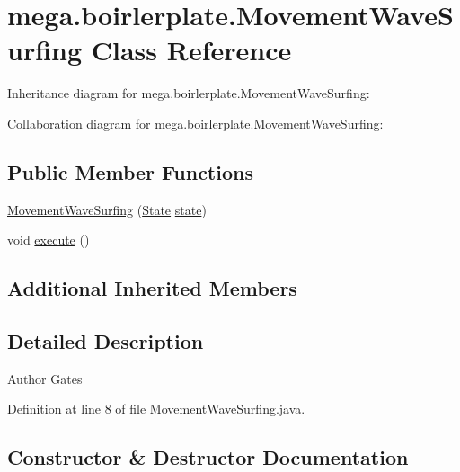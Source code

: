 \hypertarget{classmega_1_1boirlerplate_1_1_movement_wave_surfing}{}\section{mega.\+boirlerplate.\+Movement\+Wave\+Surfing Class Reference}
\label{classmega_1_1boirlerplate_1_1_movement_wave_surfing}


Inheritance diagram for mega.\+boirlerplate.\+Movement\+Wave\+Surfing\+:


Collaboration diagram for mega.\+boirlerplate.\+Movement\+Wave\+Surfing\+:
\subsection*{Public Member Functions}
\begin{DoxyCompactItemize}
\item 
\hyperlink{classmega_1_1boirlerplate_1_1_movement_wave_surfing_a1dffeffc125195fb4e59acaecaec00a3}{Movement\+Wave\+Surfing} (\hyperlink{classmega_1_1boirlerplate_1_1_state}{State} \hyperlink{classmega_1_1boirlerplate_1_1_component_a87b0d70f323b5fee60a200e07c9c20fd}{state})
\item 
void \hyperlink{classmega_1_1boirlerplate_1_1_movement_wave_surfing_a3bc154028a2cbcfd699d8fd59bdbcc14}{execute} ()
\end{DoxyCompactItemize}
\subsection*{Additional Inherited Members}


\subsection{Detailed Description}
\begin{DoxyAuthor}{Author}
Gates 
\end{DoxyAuthor}


Definition at line 8 of file Movement\+Wave\+Surfing.\+java.



\subsection{Constructor \& Destructor Documentation}
\mbox{\label{classmega_1_1boirlerplate_1_1_movement_wave_surfing_a1dffeffc125195fb4e59acaecaec00a3}} 

